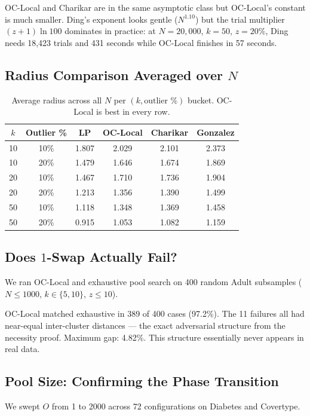 \documentclass[11pt]{article}
\begin{document}
OC-Local and Charikar are in the same asymptotic class but OC-Local's constant is much smaller. Ding's exponent looks gentle ($N^{1.10}$) but the trial multiplier $(z{+}1)\ln 100$ dominates in practice: at $N=20{,}000$, $k=50$, $z=20\%$, Ding needs 18,423 trials and 431 seconds while OC-Local finishes in 57 seconds.

\subsection{Radius Comparison Averaged over $N$}

\begin{table}[H]
\centering
\begin{tabular}{cccccc}
\toprule
$k$ & Outlier \% & LP & OC-Local & Charikar & Gonzalez \\
\midrule
10 & 10\% & 1.807 & 2.029 & 2.101 & 2.373 \\
10 & 20\% & 1.479 & 1.646 & 1.674 & 1.869 \\
20 & 10\% & 1.467 & 1.710 & 1.736 & 1.904 \\
20 & 20\% & 1.213 & 1.356 & 1.390 & 1.499 \\
50 & 10\% & 1.118 & 1.348 & 1.369 & 1.458 \\
50 & 20\% & 0.915 & 1.053 & 1.082 & 1.159 \\
\bottomrule
\end{tabular}
\caption{Average radius across all $N$ per $(k, \text{outlier \%})$ bucket.
OC-Local is best in every row.}
\end{table}

\subsection{Does $1$-Swap Actually Fail?}

We ran OC-Local and exhaustive pool search on 400 random Adult subsamples ($N \le 1000$, $k \in \{5,10\}$, $z \le 10$).

OC-Local matched exhaustive in 389 of 400 cases (97.2\%). The 11 failures all had near-equal inter-cluster distances --- the exact adversarial structure from the necessity proof. Maximum gap: 4.82\%. This structure essentially never appears in real data.

\subsection{Pool Size: Confirming the Phase Transition}

We swept $O$ from 1 to 2000 across 72 configurations on Diabetes and Covertype.
\end{document}
